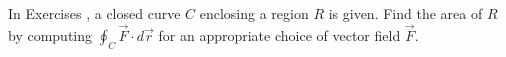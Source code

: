 {\noindent In Exercises}
{, a closed curve $C$ enclosing a region $R$ is given. Find the area of $R$ by computing $\oint_C \vec F\cdot d\vec r$ for an appropriate choice of vector field $\vec F$. 
}
